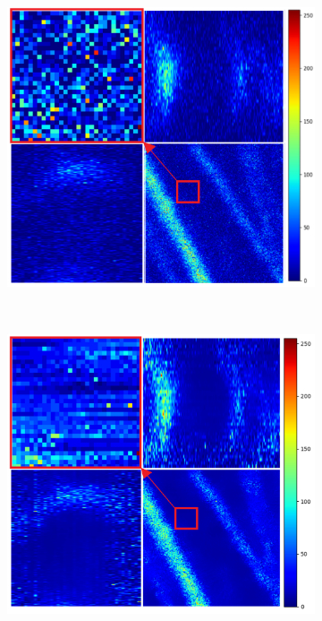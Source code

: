 \begin{figure}[H]
	
	\begin{center}
		\begin{subfigure}[t]{\dimexpr.5\linewidth-1.3em\relax}
			\centering
			\includegraphics[width=.95\linewidth,valign=t]{my_folder/images/denoising/noisy_part_color.png}
		\end{subfigure}
	\end{center}
	\hfill %
	\\[20pt]
	\begin{subfigure}[t]{\dimexpr.5\linewidth-1.3em\relax}
		\centering
		\includegraphics[width=.95\linewidth,valign=t]{my_folder/images/denoising/nlm_part_color.png}

\end{subfigure}
\end{figure}
